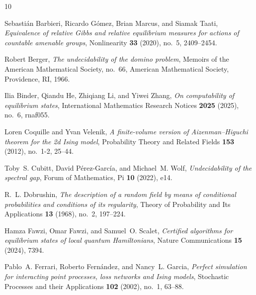 \documentclass[11pt,reqno]{amsart}
\numberwithin{equation}{section}
\theoremstyle{definition}
\theoremstyle{remark}
\begin{document}

\providecommand{\bysame}{\leavevmode\hbox to3em{\hrulefill}\thinspace}
\providecommand{\MR}{\relax\ifhmode\unskip\space\fi MR }
\providecommand{\MRhref}[2]{%
  \href{http://www.ams.org/mathscinet-getitem?mr=#1}{#2}
}
\providecommand{\href}[2]{#2}
\begin{thebibliography}{10}

Sebasti{\'a}n Barbieri, Ricardo G{\'o}mez, Brian Marcus, and Siamak Taati,
  \emph{Equivalence of relative {Gibbs} and relative equilibrium measures for
  actions of countable amenable groups}, Nonlinearity \textbf{33} (2020),
  no.~5, 2409--2454.

Robert Berger, \emph{The undecidability of the domino problem}, Memoirs of the
  American Mathematical Society, no.~66, American Mathematical Society,
  Providence, RI, 1966.

Ilia Binder, Qiandu He, Zhiqiang Li, and Yiwei Zhang, \emph{On computability of
  equilibrium states}, International Mathematics Research Notices \textbf{2025}
  (2025), no.~6, rnaf055.

Loren Coquille and Yvan Velenik, \emph{A finite-volume version of
  {Aizenman--Higuchi} theorem for the 2d {Ising} model}, Probability Theory and
  Related Fields \textbf{153} (2012), no.~1-2, 25--44.

Toby~S. Cubitt, David P{\'e}rez-Garc{\'i}a, and Michael~M. Wolf,
  \emph{Undecidability of the spectral gap}, Forum of Mathematics, Pi
  \textbf{10} (2022), e14.

R.~L. Dobrushin, \emph{The description of a random field by means of
  conditional probabilities and conditions of its regularity}, Theory of
  Probability and Its Applications \textbf{13} (1968), no.~2, 197--224.

Hamza Fawzi, Omar Fawzi, and Samuel~O. Scalet, \emph{Certified algorithms for
  equilibrium states of local quantum {Hamiltonians}}, Nature Communications
  \textbf{15} (2024), 7394.

Pablo~A. Ferrari, Roberto Fern{\'a}ndez, and Nancy~L. Garcia, \emph{Perfect
  simulation for interacting point processes, loss networks and {Ising}
  models}, Stochastic Processes and their Applications \textbf{102} (2002),
  no.~1, 63--88.


\end{thebibliography}
\end{document}
